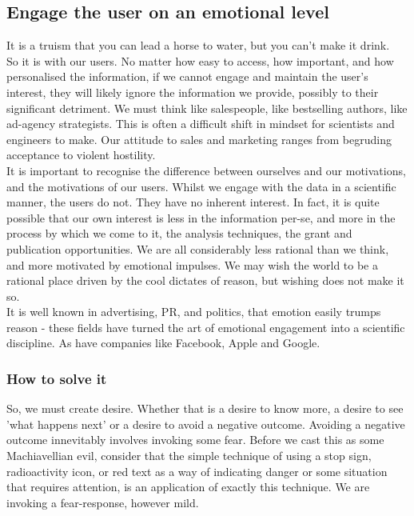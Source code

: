 \subsection{Engage the user on an emotional level}
It is a truism that you can lead a horse to water, but you can't make it drink. \\

So it is with our users.
No matter how easy to access, how important, and how personalised the information, if we cannot engage and maintain the user's interest,
they will likely ignore the information we provide, possibly to their significant detriment.
We must think like salespeople, like bestselling authors, like ad-agency strategists.
This is often a difficult shift in mindset for scientists and engineers to make.
Our attitude to sales and marketing ranges from begruding acceptance to violent hostility. \\

It is important to recognise the difference between ourselves and our motivations, and the motivations of our users. Whilst we engage with the data in a scientific
manner, the users do not. They have no inherent interest. In fact, it is quite possible that our own interest is less in the information per-se, and more in the process
by which we come to it, the analysis techniques, the grant and publication opportunities. We are all considerably less rational than we think, and more motivated by
emotional impulses. We may wish the world to be a rational place driven by the cool dictates of reason, but wishing does not make it so. \\

It is well known in advertising, PR, and politics, that emotion easily trumps reason - these fields have turned the art of emotional engagement into a scientific discipline.
As have companies like Facebook, Apple and Google.

\subsubsection*{How to solve it}

So, we must create desire. Whether that is a desire to know more, a desire to see 'what happens next' or a desire to avoid a negative outcome.
Avoiding a negative outcome innevitably involves invoking some fear. Before we cast this as some Machiavellian evil, consider that the simple
technique of using a stop sign, radioactivity icon, or red text as a way of indicating danger or some situation that requires attention, is an
application of exactly this technique. We are invoking a fear-response, however mild. \\

